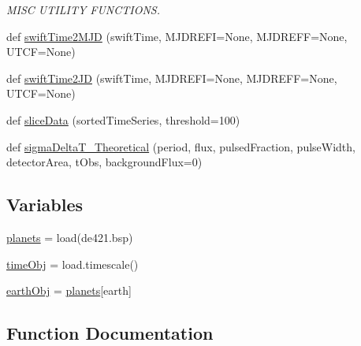 \begin{DoxyCompactItemize}
\begin{DoxyCompactList}\small\item\em M\+I\+SC U\+T\+I\+L\+I\+TY F\+U\+N\+C\+T\+I\+O\+NS. \end{DoxyCompactList}\item 
def \hyperlink{namespacemodest_1_1utils_1_1spacegeometry_a19a9c8b695537e87e1332b6cccff6860}{swift\+Time2\+M\+JD} (swift\+Time, M\+J\+D\+R\+E\+FI=None, M\+J\+D\+R\+E\+FF=None, U\+T\+CF=None)
\item 
def \hyperlink{namespacemodest_1_1utils_1_1spacegeometry_a492030a27ce72b2beae6454c2df6e295}{swift\+Time2\+JD} (swift\+Time, M\+J\+D\+R\+E\+FI=None, M\+J\+D\+R\+E\+FF=None, U\+T\+CF=None)
\item 
def \hyperlink{namespacemodest_1_1utils_1_1spacegeometry_a56a9b16ea25f058319b42c6cd3e813b1}{slice\+Data} (sorted\+Time\+Series, threshold=100)
\item 
def \hyperlink{namespacemodest_1_1utils_1_1spacegeometry_a038ea404fb8280c079d7bc3d138f2cc9}{sigma\+Delta\+T\+\_\+\+Theoretical} (period, flux, pulsed\+Fraction, pulse\+Width, detector\+Area, t\+Obs, background\+Flux=0)
\end{DoxyCompactItemize}
\subsection*{Variables}
\begin{DoxyCompactItemize}
\item 
\hyperlink{namespacemodest_1_1utils_1_1spacegeometry_a2aa86c4eec1470b4c2a8abf26189068a}{planets} = load(\textquotesingle{}de421.\+bsp\textquotesingle{})
\item 
\hyperlink{namespacemodest_1_1utils_1_1spacegeometry_a4599db8252172dbf742cbd65616b3bee}{time\+Obj} = load.\+timescale()
\item 
\hyperlink{namespacemodest_1_1utils_1_1spacegeometry_a5e817563041c43da2d36d223bade1512}{earth\+Obj} = \hyperlink{namespacemodest_1_1utils_1_1spacegeometry_a2aa86c4eec1470b4c2a8abf26189068a}{planets}\mbox{[}\textquotesingle{}earth\textquotesingle{}\mbox{]}
\end{DoxyCompactItemize}


\subsection{Function Documentation}
